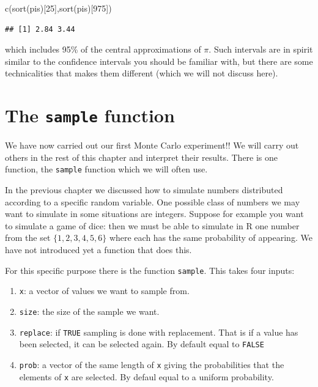 \documentclass[
]{book}
\newenvironment{Shaded}{\begin{snugshade}}{\end{snugshade}}
\newcommand{\DecValTok}[1]{\textcolor[rgb]{0.00,0.00,0.81}{#1}}
\newcommand{\FunctionTok}[1]{\textcolor[rgb]{0.00,0.00,0.00}{#1}}
\newcommand{\NormalTok}[1]{#1}
\begin{document}
\begin{Shaded}
\begin{Highlighting}[]
\FunctionTok{c}\NormalTok{(}\FunctionTok{sort}\NormalTok{(pis)[}\DecValTok{25}\NormalTok{],}\FunctionTok{sort}\NormalTok{(pis)[}\DecValTok{975}\NormalTok{])}
\end{Highlighting}
\end{Shaded}

\begin{verbatim}
## [1] 2.84 3.44
\end{verbatim}

which includes 95\% of the central approximations of \(\pi\). Such intervals are in spirit similar to the confidence intervals you should be familiar with, but there are some technicalities that makes them different (which we will not discuss here).

\hypertarget{the-sample-function}{%
\section{\texorpdfstring{The \texttt{sample} function}{The sample function}}\label{the-sample-function}}

We have now carried out our first Monte Carlo experiment!! We will carry out others in the rest of this chapter and interpret their results. There is one function, the \texttt{sample} function which we will often use.

In the previous chapter we discussed how to simulate numbers distributed according to a specific random variable. One possible class of numbers we may want to simulate in some situations are integers. Suppose for example you want to simulate a game of dice: then we must be able to simulate in R one number from the set \(\{1,2,3,4,5,6\}\) where each has the same probability of appearing. We have not introduced yet a function that does this.

For this specific purpose there is the function \texttt{sample}. This takes four inputs:

\begin{enumerate}
\def\labelenumi{\arabic{enumi}.}
\item
  \texttt{x}: a vector of values we want to sample from.
\item
  \texttt{size}: the size of the sample we want.
\item
  \texttt{replace}: if \texttt{TRUE} sampling is done with replacement. That is if a value has been selected, it can be selected again. By default equal to \texttt{FALSE}
\item
  \texttt{prob}: a vector of the same length of \texttt{x} giving the probabilities that the elements of \texttt{x} are selected. By defaul equal to a uniform probability.
\end{enumerate}
\end{document}
